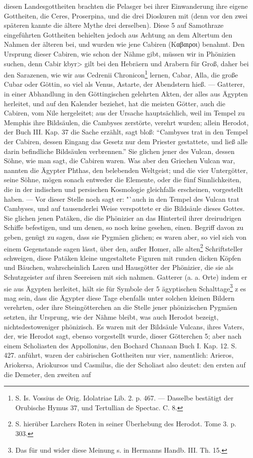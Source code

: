 \documentclass[a4paper, 11pt, oneside, polutonikogreek, german]{article}
\begin{document}
diesen Landesgottheiten brachten die Pelasger bei ihrer Einwanderung ihre eigene Gottheiten, die Ceres, Proserpina, und die drei Dioskuren mit (denn vor den zwei späteren kannte die ältere Mythe drei derselben). Diese 5 auf Samothraze eingeführten Gottheiten behielten jedoch aus Achtung an dem Altertum den Nahmen der älteren bei, und wurden wie jene Cabiren (Καβαιροι) benahmt. Den Ursprung dieser Cabiren, wie schon der Nähme gibt, müssen wir in Phönizien suchen, denn Cabir \<kbyr> gilt bei den Hebräern und Arabern für Groß, daher bei den Sarazenen, wie wir aus Cedrenii Chronicon\footnote{S. Is. Vossius de Orig. Idolatriae Lib. 2. p. 467. --- Dasselbe bestätigt der Orubische Hymus 37, und Tertullian de Spectac. C. 8.} lernen, Cabar, Alla, die große Cubar oder Göttin, so viel als Venus, Astarte, der Abendstern hieß. --- Gatterer, in einer Abhandlung in den Göttingischen gelehrten Akten, der alles aus Ägypten herleitet, und auf den Kalender beziehet, hat die meisten Götter, auch die Cabiren, vom Nile hergeleitet; aus der Ursache hauptsächlich, weil im Tempel zu Memphis ihre Bildsäulen, die Cambyses zerstörte, verehrt wurden; allein Herodot, der Buch III. Kap. 37 die Sache erzählt, sagt bloß: "`Cambyses trat in den Tempel der Cabiren, dessen Eingang das Gesetz nur dem Priester gestattete, und ließ alle darin befindliche Bildsäulen verbrennen."' Sie glichen jener des Vulcan, dessen Söhne, wie man sagt, die Cabiren waren. Was aber den Griechen Vulcan war, nannten die Ägypter Phthas, den belebenden Weltgeist; und die vier Untergötter, seine Söhne, mögen sonach entweder die Elemente, oder die fünf Sinnlichkeiten, die in der indischen und persischen Kosmologie gleichfalls erscheinen, vorgestellt haben. --- Vor dieser Stelle noch sagt er: "`auch in den Tempel des Vulcan trat Cambyses, und auf tausenderlei Weise verspottete er die Bildsäule dieses Gottes. Sie glichen jenen Patäken, die die Phönizier an das Hinterteil ihrer dreirudrigen Schiffe befestigen, und um denen, so noch keine gesehen, einen. Begriff davon zu geben, genügt zu sagen, dass sie Pygmäen glichen; es waren aber, so viel sich von einem Gegenstande sagen lässt, über den, außer Homer, alle alten\footnote{S. hierüber Larchers Roten in seiner Überhebung des Herodot. Tome 3. p. 303.} Schriftsteller schweigen, diese Patäken kleine ungestaltete Figuren mit runden dicken Köpfen und Bäuchen, wahrscheinlich Laren und Hausgötter der Phönizier, die sie als Schutzgeister auf ihren Seereisen mit sich nahmen. Gatterer (a. a. Orte) indem er sie aus Ägypten herleitet, hält sie für Symbole der 5 ägyptischen Schalttage\footnote{Das für und wider diese Meinung s. in Hermanns Handb. III. Th. 15.} z es mag sein, dass die Ägypter diese Tage ebenfalls unter solchen kleinen Bildern verehrten, oder ihre Steingötterchen an die Stelle jener phönizischen Pygmäen setzten, ihr Ursprung, wie der Nähme bleibt, was auch Herodot bezeigt, nichtsdestoweniger phönizisch. Es waren mit der Bildsäule Vulcans, ihres Vaters, der, wie Herodot sagt, ebenso vorgestellt wurde, dieser Götterchen 5; aber nach einem Scholiasten des Appollonius, den Bochard Chanaan Buch I. Kap. 12. S. 427. anführt, waren der cabirischen Gottheiten nur vier, namentlich: Arieros, Ariokersa, Ariokursos und Casmilus, die der Scholiast also deutet: den ersten auf die Demeter, den zweiten auf 
\end{document}
